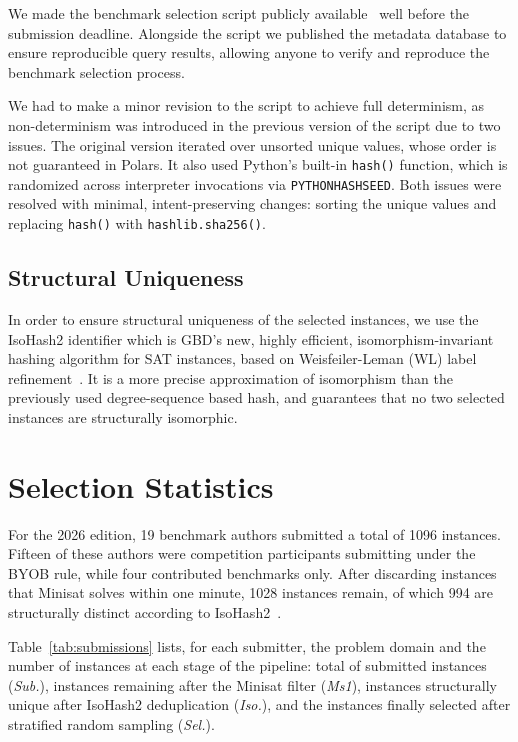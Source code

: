 \documentclass[conference]{IEEEtran}
\begin{document}
We made the benchmark selection script publicly available~\cite{sc2026web} well before the submission deadline. Alongside the script we published the metadata database to ensure reproducible query results, allowing anyone to verify and reproduce the benchmark selection process.

We had to make a minor revision to the script to achieve full determinism, as non-determinism was introduced in the previous version of the script due to two issues.
The original version iterated over unsorted unique values, whose order is not guaranteed in Polars.
It also used Python's built-in \texttt{hash()} function, which is randomized across interpreter invocations via \texttt{PYTHONHASHSEED}.
Both issues were resolved with minimal, intent-preserving changes: sorting the unique values and replacing \texttt{hash()} with \texttt{hashlib.sha256()}.

\subsection{Structural Uniqueness}\label{sec:isohash}

In order to ensure structural uniqueness of the selected instances, we use the IsoHash2 identifier which is GBD's new, highly efficient, isomorphism-invariant hashing algorithm for SAT instances, based on Weisfeiler-Leman (WL) label refinement~\cite{isohash2}.
It is a more precise approximation of isomorphism than the previously used degree-sequence based hash, and guarantees that no two selected instances are structurally isomorphic.

\section{Selection Statistics}\label{sec:stats}

For the 2026 edition, 19 benchmark authors submitted a total of 1096 instances.
Fifteen of these authors were competition participants submitting under the BYOB rule, while four contributed benchmarks only.
After discarding instances that Minisat solves within one minute, 1028 instances remain, of which 994 are structurally distinct according to IsoHash2~\cite{isohash2}.

Table~\ref{tab:submissions} lists, for each submitter, the problem domain and the number of instances at each stage of the pipeline: total of submitted instances (\emph{Sub.}), instances remaining after the Minisat filter (\emph{Ms1}), instances structurally unique after IsoHash2 deduplication (\emph{Iso.}), and the instances finally selected after stratified random sampling (\emph{Sel.}).
\end{document}
